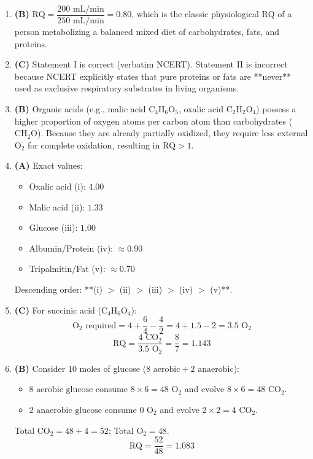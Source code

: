 \documentclass[11pt, a4paper]{article}
\begin{document}
\begin{enumerate}[label=\textbf{\arabic*.}]
\item \textbf{(B)} $\text{RQ} = \dfrac{200\text{ mL/min}}{250\text{ mL/min}} = \mathbf{0.80}$, which is the classic physiological $\text{RQ}$ of a person metabolizing a balanced mixed diet of carbohydrates, fats, and proteins.

\item \textbf{(C)} Statement I is correct (verbatim NCERT). Statement II is incorrect because NCERT explicitly states that pure proteins or fats are **never** used as exclusive respiratory substrates in living organisms.

\item \textbf{(B)} Organic acids (e.g., malic acid $\text{C}_4\text{H}_6\text{O}_5$, oxalic acid $\text{C}_2\text{H}_2\text{O}_4$) possess a higher proportion of oxygen atoms per carbon atom than carbohydrates ($\text{CH}_2\text{O}$). Because they are already partially oxidized, they require less external $\text{O}_2$ for complete oxidation, resulting in $\text{RQ} > 1$.

\item \textbf{(A)} Exact values:
\begin{itemize}
    \item Oxalic acid (i): $4.00$
    \item Malic acid (ii): $1.33$
    \item Glucose (iii): $1.00$
    \item Albumin/Protein (iv): $\approx 0.90$
    \item Tripalmitin/Fat (v): $\approx 0.70$
\end{itemize}
Descending order: **(i) $>$ (ii) $>$ (iii) $>$ (iv) $>$ (v)**.

\item \textbf{(C)} For succinic acid ($\text{C}_4\text{H}_6\text{O}_4$):
$$\text{O}_2 \text{ required} = 4 + \frac{6}{4} - \frac{4}{2} = 4 + 1.5 - 2 = 3.5\text{ O}_2$$
$$\text{RQ} = \frac{4\text{ CO}_2}{3.5\text{ O}_2} = \frac{8}{7} = \mathbf{1.143}$$

\item \textbf{(B)} Consider $10\text{ moles}$ of glucose ($8\text{ aerobic} + 2\text{ anaerobic}$):
\begin{itemize}
    \item $8\text{ aerobic glucose}$ consume $8 \times 6 = 48\text{ O}_2$ and evolve $8 \times 6 = 48\text{ CO}_2$.
    \item $2\text{ anaerobic glucose}$ consume $0\text{ O}_2$ and evolve $2 \times 2 = 4\text{ CO}_2$.
\end{itemize}
Total $\text{CO}_2 = 48 + 4 = 52$; Total $\text{O}_2 = 48$.
$$\text{RQ} = \frac{52}{48} = \mathbf{1.083}$$


\end{enumerate}
\end{document}
